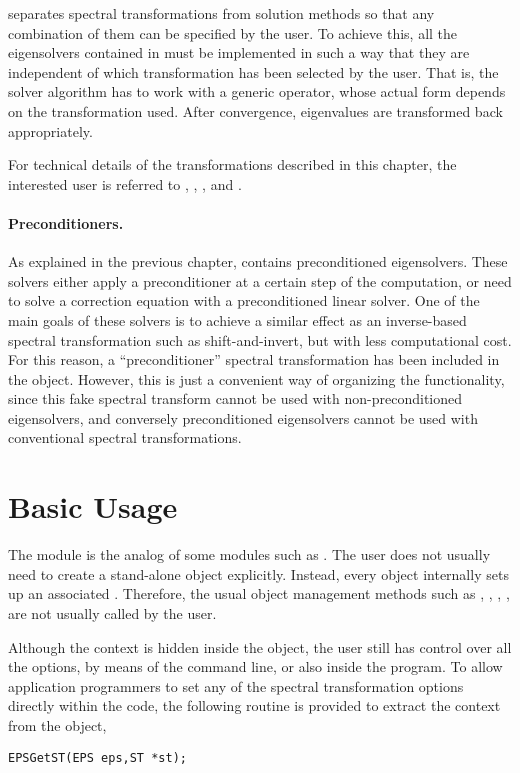 	\slepc separates spectral transformations from solution methods so that any combination of them can be specified by the user. To achieve this, all the eigensolvers contained in  must be implemented in such a way that they are independent of which transformation has been selected by the user. That is, the solver algorithm has to work with a generic operator, whose actual form depends on the transformation used. After convergence, eigenvalues are transformed back appropriately. 

	For technical details of the transformations described in this chapter, the interested user is referred to \citep{Ericsson:1980:STL}, \citep{Scott:1982:AIO}, \citep{Nour-Omid:1987:HIS}, and \citep{Meerbergen:1994:SCT}.

\paragraph{Preconditioners.}

As explained in the previous chapter,  contains preconditioned eigensolvers. These solvers either apply a preconditioner at a certain step of the computation, or need to solve a correction equation with a preconditioned linear solver. One of the main goals of these solvers is to achieve a similar effect as an inverse-based spectral transformation such as shift-and-invert, but with less computational cost. For this reason, a ``preconditioner'' spectral transformation has been included in the  object. However, this is just a convenient way of organizing the functionality, since this fake spectral transform cannot be used with non-preconditioned eigensolvers, and conversely preconditioned eigensolvers cannot be used with conventional spectral transformations.

\section{Basic Usage}

	The  module is the analog of some \petsc modules such as . The user does not usually need to create a stand-alone  object explicitly. Instead, every  object internally sets up an associated . Therefore, the usual object management methods such as , , , , are not usually called by the user.

	Although the  context is hidden inside the  object, the user still has control over all the options, by means of the command line, or also inside the program. To allow application programmers to set any of the spectral transformation options directly within the code, the following routine is provided to extract the  context from the  object,
	\begin{Verbatim}[fontsize=\small]
	EPSGetST(EPS eps,ST *st);
	\end{Verbatim}
	
